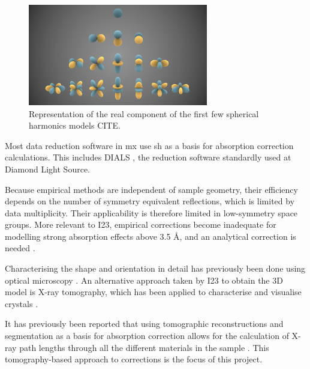 \begin{figure}
    \centering
    \includegraphics[width = 0.7\textwidth]{images/Spherical_Harmonics.png}
    \caption{Representation of the real component of the first few spherical harmonics models CITE.}
    \label{fig:SH}
\end{figure}

Most data reduction software in \ac{mx} use \ac{sh} as a basis for absorption correction calculations. This includes DIALS \cite{Winter2018}, the reduction software standardly used at Diamond Light Source.

Because empirical methods are independent of sample geometry, their efficiency depends on the number of symmetry equivalent reflections, which is limited by data multiplicity. Their applicability is therefore limited in low-symmetry space groups. More relevant to I23, empirical corrections become inadequate for modelling strong absorption effects above 3.5 Å, and an analytical correction is needed \cite{Kazantsev2021}.

Characterising the shape and orientation in detail has previously been done using optical microscopy \cite{Leal2008, Strutz2011}. %
An alternative approach taken by I23 to obtain the 3D model is X-ray tomography, which has been applied to characterise and visualise crystals \cite{Merrifield2011, Warren2013}.%

 It has previously been reported that using tomographic reconstructions and segmentation as a basis for absorption correction allows for the calculation of X-ray path lengths through all the different materials in the sample \cite{Brockhauser2008}. This tomography-based approach to corrections is the focus of this project.

